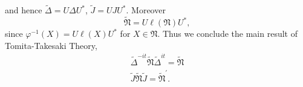 and hence $\tilde{\Delta}=U\Delta U^\ast$, $\tilde{J}=UJU^\ast$.
Moreover  
$$
\tilde{\mathfrak{N}}=U\ell(\mathfrak{N})U^\ast,
$$
since $\varphi^{-1}(X)=U\ell (X) U^\ast$ for $X\in \mathfrak{N}$.
Thus we conclude the main result of Tomita-Takesaki Theory,
\begin{equation}
\begin{split}
\tilde{\Delta}^{-it}\tilde{\mathfrak{N}}\tilde{\Delta}^{it}=\tilde{\mathfrak{N}}\\
\tilde{J}\tilde{\mathfrak{N}}\tilde{J}=\tilde{\mathfrak{N}}^\prime.
\end{split}
\end{equation}


